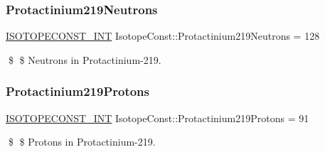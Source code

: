 \subsubsection{\texorpdfstring{Protactinium219\+Neutrons}{Protactinium219Neutrons}}
{\footnotesize\ttfamily \mbox{\hyperlink{group___isotope_const-_macros_ga5f18360b3e99483a35c32d789e62621c}{I\+S\+O\+T\+O\+P\+E\+C\+O\+N\+S\+T\+\_\+\+I\+NT}} Isotope\+Const\+::\+Protactinium219\+Neutrons = 128}

\$ \$ Neutrons in Protactinium-\/219. \mbox{\label{group___isotope_const-_protactinium-_pa219_ga3a279025bce626905e2b693907395785}} 
\subsubsection{\texorpdfstring{Protactinium219\+Protons}{Protactinium219Protons}}
{\footnotesize\ttfamily \mbox{\hyperlink{group___isotope_const-_macros_ga5f18360b3e99483a35c32d789e62621c}{I\+S\+O\+T\+O\+P\+E\+C\+O\+N\+S\+T\+\_\+\+I\+NT}} Isotope\+Const\+::\+Protactinium219\+Protons = 91}

\$ \$ Protons in Protactinium-\/219. 